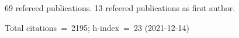 69 refereed publications. 13 refeered publications as first author.

Total citations~=~2195; h-index~=~23 (2021-12-14)